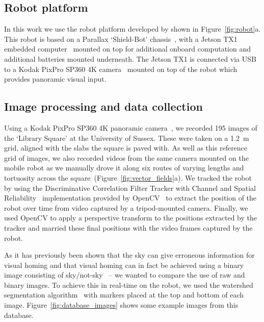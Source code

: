 \documentclass[letterpaper]{article}
\begin{document}
\subsection{Robot platform}
\label{sec:robot_platform}
In this work we use the robot platform developed by \citet{Domcsek2018} shown in Figure~\ref{fig:robot}a.
This robot is based on a Parallax `Shield-Bot' chassis~\citep{ParallaxInc}, with a Jetson TX1 embedded computer~\citep{NVIDIACorporation2016} mounted on top for additional onboard computation and additional batteries mounted underneath. 
The Jetson TX1 is connected via USB to a Kodak PixPro SP360 4K camera~\citep{JKImagingLtd} mounted on top of the robot which provides panoramic visual input.

\subsection{Image processing and data collection}
\label{sec:image_database}
Using a Kodak PixPro SP360 4K panoramic camera~\citep{JKImagingLtd}, we recorded \num{195} images of the ‘Library Square’ at the University of Sussex. 
These were taken on a \SI{1.2}{\metre} grid, aligned with the slabs the square is paved with.
As well as this reference grid of images, we also recorded videos from the same camera mounted on the mobile robot as we manually drove it along six routes of varying lengths and tortuosity across the square~(Figure~\ref{fig:vector_fields}a).
We tracked the robot by using the Discriminative Correlation Filter Tracker with Channel and Spatial Reliability~\citep{Lukezic2018} implementation provided by OpenCV~\citep{OpenCV} to extract the position of the robot over time from video captured by a tripod-mounted camera. 
Finally, we used OpenCV to apply a perspective transform to the positions extracted by the tracker and married these final positions with the video frames captured by the robot. 

As it has previously been shown that the sky can give erroneous information for visual homing and that visual homing can in fact be achieved using a binary image consisting of sky/not-sky~\citep{Philippides2011,Stone2014} -- we wanted to compare the use of raw and binary images.
To achieve this in real-time on the robot, we used the watershed segmentation algorithm~\citep{Beucher1979} with markers placed at the top and bottom of each image.
Figure~\ref{fig:database_images} shows some example images from this database.
\end{document}
